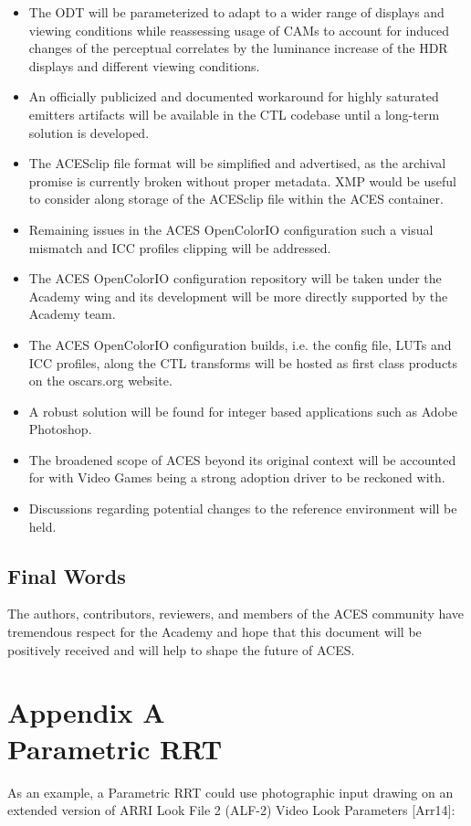 \documentclass[conference]{IEEEtran}
\begin{document}
\begin{itemize}
    \item The ODT will be parameterized to adapt to a wider range of displays and viewing conditions while reassessing usage of CAMs to account for induced changes of the perceptual correlates by the luminance increase of the HDR displays and different viewing conditions.
    \item An officially publicized and documented workaround for highly saturated emitters artifacts will be available in the CTL codebase until a long-term solution is developed.
    \item The ACESclip file format will be simplified and advertised, as the archival promise is currently broken without proper metadata. XMP would be useful to consider along storage of the ACESclip file within the ACES container.
    \item Remaining issues in the ACES OpenColorIO configuration such a visual mismatch and ICC profiles clipping will be addressed.
    \item The ACES OpenColorIO configuration repository will be taken under the Academy wing and its development will be more directly supported by the Academy team.
    \item The ACES OpenColorIO configuration builds, i.e. the config file, LUTs and ICC profiles, along the CTL transforms will be hosted as first class products on the oscars.org website.
    \item A robust solution will be found for integer based applications such as Adobe Photoshop.
    \item The broadened scope of ACES beyond its original context will be accounted for with Video Games being a strong adoption driver to be reckoned with.
    \item Discussions regarding potential changes to the reference environment will be held.
\end{itemize}

\subsection{Final Words}
The authors, contributors, reviewers, and members of the ACES community have tremendous respect for the Academy and hope that this document will be positively received and will help to shape the future of ACES.

\section*{Appendix A\\ \small Parametric RRT}
As an example, a Parametric RRT could use photographic input drawing on an extended version of ARRI Look File 2 (ALF-2) Video Look Parameters [Arr14]:
\end{document}
